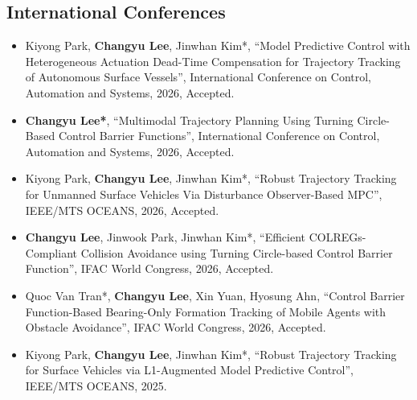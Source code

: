 \documentclass[10pt, letterpaper]{article}
\begin{document}
    \subsection{International Conferences} %
    \begin{itemize}
        \item [\textbf{[C12]}] Kiyong Park, \textbf{Changyu Lee}, Jinwhan Kim*, “Model Predictive Control with Heterogeneous Actuation Dead-Time Compensation for Trajectory Tracking of Autonomous Surface Vessels”, \textcolor{NavyBlue}{International Conference on Control, Automation and Systems}, 2026, Accepted.

            \vspace{0.2 cm}

        \item [\textbf{[C11]}] \textbf{Changyu Lee*}, “Multimodal Trajectory Planning Using Turning Circle-Based Control Barrier Functions”, \textcolor{NavyBlue}{International Conference on Control, Automation and Systems}, 2026, Accepted.

            \vspace{0.2 cm}

        \item [\textbf{[C10]}] Kiyong Park, \textbf{Changyu Lee}, Jinwhan Kim*, “Robust Trajectory Tracking for Unmanned Surface Vehicles Via Disturbance Observer-Based MPC”, \textcolor{NavyBlue}{IEEE/MTS OCEANS}, 2026, Accepted.

            \vspace{0.2 cm}

        \item [\textbf{[C9]}] \textbf{Changyu Lee}, Jinwook Park, Jinwhan Kim*, “Efficient COLREGs-Compliant Collision Avoidance using Turning Circle-based Control Barrier Function”, \textcolor{NavyBlue}{IFAC World Congress}, 2026, Accepted.

            \vspace{0.2 cm}

        \item [\textbf{[C8]}] Quoc Van Tran*, \textbf{Changyu Lee}, Xin Yuan, Hyosung Ahn, “Control Barrier Function-Based Bearing-Only Formation Tracking of Mobile Agents with Obstacle Avoidance”, \textcolor{NavyBlue}{IFAC World Congress}, 2026, Accepted.

            \vspace{0.2 cm}

        \item 
        [\textbf{[C7]}]   Kiyong Park, \textbf{Changyu Lee}, Jinwhan Kim*, “Robust Trajectory Tracking for Surface Vehicles via L1-Augmented Model Predictive Control”, \textcolor{NavyBlue}{IEEE/MTS OCEANS}, 2025.
            

\end{itemize}
\end{document}
